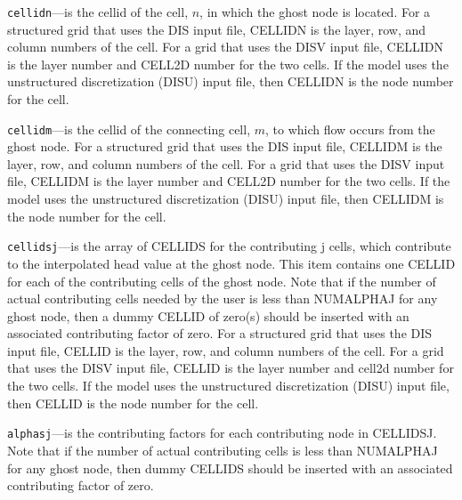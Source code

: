 \begin{description}
\item \texttt{cellidn}---is the cellid of the cell, $n$, in which the ghost node is located. For a structured grid that uses the DIS input file, CELLIDN is the layer, row, and column numbers of the cell.   For a grid that uses the DISV input file, CELLIDN is the layer number and CELL2D number for the two cells.  If the model uses the unstructured discretization (DISU) input file, then CELLIDN is the node number for the cell.

\item \texttt{cellidm}---is the cellid of the connecting cell, $m$, to which flow occurs from the ghost node. For a structured grid that uses the DIS input file, CELLIDM is the layer, row, and column numbers of the cell.   For a grid that uses the DISV input file, CELLIDM is the layer number and CELL2D number for the two cells.  If the model uses the unstructured discretization (DISU) input file, then CELLIDM is the node number for the cell.

\item \texttt{cellidsj}---is the array of CELLIDS for the contributing j cells, which contribute to the interpolated head value at the ghost node. This item contains one CELLID for each of the contributing cells of the ghost node. Note that if the number of actual contributing cells needed by the user is less than NUMALPHAJ for any ghost node, then a dummy CELLID of zero(s) should be inserted with an associated contributing factor of zero. For a structured grid that uses the DIS input file, CELLID is the layer, row, and column numbers of the cell.   For a grid that uses the DISV input file, CELLID is the layer number and cell2d number for the two cells.  If the model uses the unstructured discretization (DISU) input file, then CELLID is the node number for the cell.

\item \texttt{alphasj}---is the contributing factors for each contributing node in CELLIDSJ. Note that if the number of actual contributing cells is less than NUMALPHAJ for any ghost node, then dummy CELLIDS should be inserted with an associated contributing factor of zero.

\end{description}

